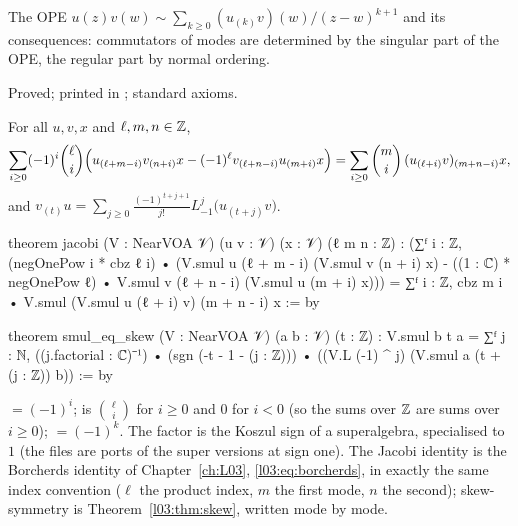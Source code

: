 \begin{physics}
The OPE $u(z)v(w)\sim\sum_{k\ge0}(u_{(k)}v)(w)/(z-w)^{k+1}$ and its consequences: commutators of modes are
determined by the singular part of the OPE, the regular part by normal ordering.
\end{physics}

\begin{status}
Proved; printed in ; standard axioms.
\end{status}

\begin{theorem}\label{ch17:thm:nearborcherds}
For all $u,v,x$ and $\ell,m,n\in{\mathbb{Z}}$,
\begin{multline*}
\sum_{i\ge0}(-1)^i\binom\ell i\Bigl(u_{(\ell+m-i)}v_{(n+i)}x-(-1)^\ell v_{(\ell+n-i)}u_{(m+i)}x\Bigr)
=\sum_{i\ge0}\binom mi\,(u_{(\ell+i)}v)_{(m+n-i)}x,
\end{multline*}
and $v_{(t)}u=\sum_{j\ge0}\frac{(-1)^{t+j+1}}{j!}L_{-1}^j\bigl(u_{(t+j)}v\bigr)$.
\end{theorem}

\begin{leancode}
theorem jacobi (V : NearVOA 𝒱) (u v : 𝒱) (x : 𝒱) (ℓ m n : ℤ) :
    (∑ᶠ i : ℤ, (negOnePow i * cbz ℓ i) •
        (V.smul u (ℓ + m - i) (V.smul v (n + i) x)
          - ((1 : ℂ) * negOnePow ℓ) • V.smul v (ℓ + n - i) (V.smul u (m + i) x)))
      = ∑ᶠ i : ℤ, cbz m i • V.smul (V.smul u (ℓ + i) v) (m + n - i) x := by

theorem smul_eq_skew (V : NearVOA 𝒱) (a b : 𝒱) (t : ℤ) :
    V.smul b t a
      = ∑ᶠ j : ℕ, ((j.factorial : ℂ)⁻¹) •
          (sgn (-t - 1 - (j : ℤ))) •
            ((V.L (-1) ^ j) (V.smul a (t + (j : ℤ)) b)) := by
\end{leancode}

\begin{dictionary}
 $=(-1)^i$;  is $\binom\ell i$ for $i\ge0$ and $0$ for $i<0$ (so the sums over ${\mathbb{Z}}$ are sums over
$i\ge0$);  $=(-1)^k$.  The factor  is the Koszul sign of a superalgebra, specialised to $1$
(the files are ports of the super versions at sign one).  The Jacobi identity is
the Borcherds identity of Chapter~\ref{ch:L03}, \eqref{l03:eq:borcherds}, in exactly the same index convention ($\ell$ the
product index, $m$ the first mode, $n$ the second); skew-symmetry is Theorem~\ref{l03:thm:skew}, written mode by mode.
\end{dictionary}

